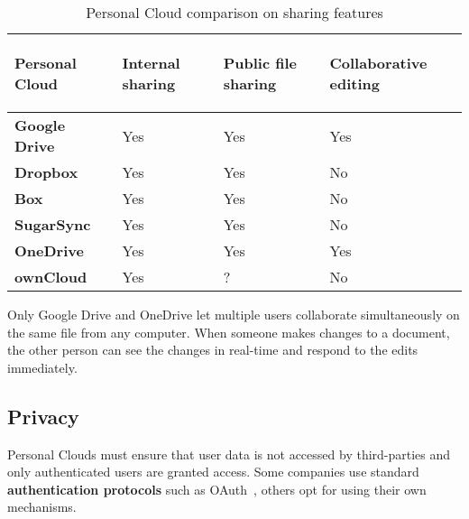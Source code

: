 {
\def\arraystretch{1.5}

\begin{table}
\begin{center}
    \begin{tabular}{ | p{3.3cm} | p{1.5cm} | p{1.5cm} | p{1.5cm} | }
    \hline
    \rowcolor[gray]{0.8}

	\textbf{Personal Cloud} &
	\begin{sideways}\textbf{Internal sharing}\end{sideways} &
	\begin{sideways}\textbf{Public file sharing}\end{sideways} &
	\begin{sideways}\textbf{Collaborative editing}\end{sideways} \\ \hline

	\textbf{Google Drive} &
	Yes &
	Yes &
	Yes \\ \hline

	\textbf{Dropbox} &
	Yes &
	Yes &
	No \\ \hline
	
	\textbf{Box} &
	Yes &
	Yes &
	No \\ \hline
	
	\textbf{SugarSync} & 
	Yes &
	Yes &
	No \\ \hline
	
	\textbf{OneDrive} & 
	Yes &
	Yes &
	Yes \\ \hline
	
	\textbf{ownCloud} &
	Yes &
	? &
	No \\ \hline

    \end{tabular}
    \caption{Personal Cloud comparison on sharing features}
    \label{tab:pc_sharing}
\end{center}
\end{table}
}



Only Google Drive and OneDrive let multiple users collaborate simultaneously on the same file from any computer. When someone makes changes to a document, the other person can see the changes in real-time and respond to the edits immediately.

\subsection{Privacy}


Personal Clouds must ensure that user data is not accessed by third-parties and only authenticated users are granted access. Some companies use standard \textbf{authentication protocols} such as OAuth~\cite{oauth}, others opt for using their own mechanisms.

